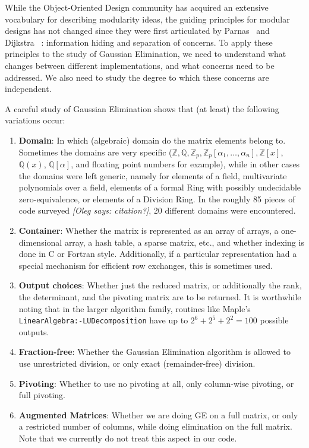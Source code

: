 \documentclass{llncs}
\newcommand{\oleg}[1]{{\it [Oleg says: #1]}}
\begin{document}
While the Object-Oriented Design community has acquired an extensive
vocabulary for describing modularity ideas, the guiding principles for
modular designs has not changed since they were first articulated by
Parnas~\cite{journals/cacm/parnas72a} and Dijkstra~
\cite{EWD:EWD447}: information hiding and separation of concerns.  To
apply these principles to the study of Gaussian Elimination, we need
to understand what changes between different implementations, and 
what concerns need to be addressed.  We also need to study the degree
to which these concerns are independent.

A careful study of Gaussian Elimination \cite{carette04} shows that
(at least) the following variations occur:
\begin{enumerate}
	\item \textbf{Domain}: In which (algebraic) domain do the matrix
		elements belong to.  Sometimes the domains are very specific
		($\mathbb{Z}, \mathbb{Q}, \mathbb{Z}_p, 
		\mathbb{Z}_p\left[\alpha_1,\ldots,\alpha_n\right], 
		\mathbb{Z}\left[x\right]$, $\mathbb{Q}\left(x\right)$, 
		$\mathbb{Q}\left[\alpha\right]$, and floating point numbers for 
		example), while in other cases the domains were left generic,
		namely for elements of a field,
		multivariate polynomials over a field, elements of a formal Ring
		with possibly undecidable zero-equivalence, or elements of a 
		Division Ring.  In the roughly 85 pieces of code
		surveyed \oleg{citation?},
		20 different domains were encountered.
	\item \textbf{Container}: Whether the matrix
		is represented as an array of arrays, a one-dimensional array,
		a hash table, a sparse matrix, etc., and
		whether indexing is done in C or Fortran style.  Additionally,
		if a particular representation had a special mechanism for efficient
		row exchanges, this is sometimes used.  
	\item \textbf{Output choices}:  Whether just the reduced matrix, or
		additionally the rank, the determinant, and the
		pivoting matrix are to be returned.
		It is worthwhile noting that in the larger algorithm family,
		routines like Maple's \texttt{LinearAlgebra:-LUDecomposition} have
		up to $2^6 + 2^5 + 2^2 = 100$ possible outputs.
	\item \textbf{Fraction-free}: Whether the Gaussian Elimination
		algorithm is allowed to use unrestricted division, or only
		exact (remainder-free) division.
	\item \textbf{Pivoting}: Whether to use no pivoting at all, only
		column-wise pivoting, or full pivoting.
	\item \textbf{Augmented Matrices}: Whether we are doing GE on
		a full matrix, or only a restricted number of columns, while
		doing elimination on the full matrix.  Note that we currently
		do not treat this aspect in our code.
\end{enumerate}
\end{document}
